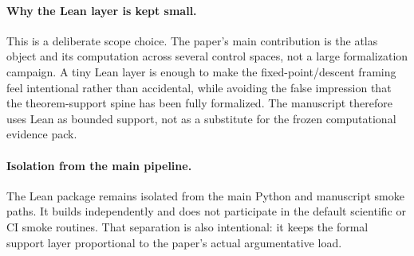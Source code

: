 \documentclass[11pt]{article}
\theoremstyle{definition}
\begin{document}
\paragraph{Why the Lean layer is kept small.}
This is a deliberate scope choice. The paper's main contribution is the atlas object and its computation across several control spaces, not a large formalization campaign. A tiny Lean layer is enough to make the fixed-point/descent framing feel intentional rather than accidental, while avoiding the false impression that the theorem-support spine has been fully formalized. The manuscript therefore uses Lean as bounded support, not as a substitute for the frozen computational evidence pack.

\paragraph{Isolation from the main pipeline.}
The Lean package remains isolated from the main Python and manuscript smoke paths. It builds independently and does not participate in the default scientific or CI smoke routines. That separation is also intentional: it keeps the formal support layer proportional to the paper's actual argumentative load.
 


\end{document}
